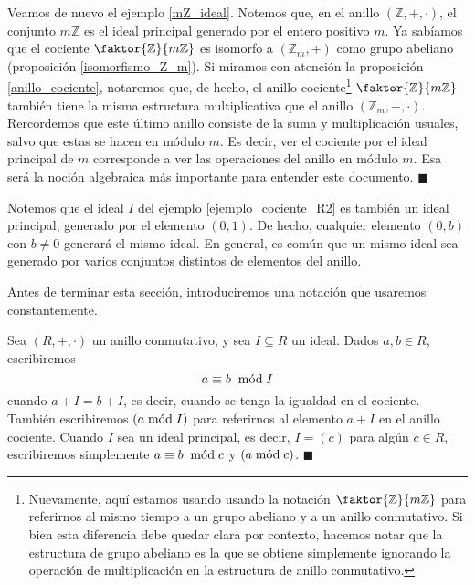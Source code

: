 \begin{example} \label{modulo_n}
Veamos de nuevo el ejemplo \ref{mZ_ideal}. Notemos que, en el anillo $(\mathbb{Z}, +, \cdot)$, el conjunto $m\mathbb{Z}$ es el ideal principal generado por el entero positivo $m$. Ya sabíamos que el cociente $\faktor{\mathbb{Z}}{m\mathbb{Z}}$ es isomorfo a $(\mathbb{Z}_m, +)$ como grupo abeliano (proposición \ref{isomorfismo_Z_m}). Si miramos con atención la proposición \ref{anillo_cociente}, notaremos que, de hecho, el anillo cociente\footnote{Nuevamente, aquí estamos usando usando la notación $\faktor{\mathbb{Z}}{m\mathbb{Z}}$ para referirnos al mismo tiempo a un grupo abeliano y a un anillo conmutativo. Si bien esta diferencia debe quedar clara por contexto, hacemos notar que la estructura de grupo abeliano es la que se obtiene simplemente ignorando la operación de multiplicación en la estructura de anillo conmutativo.} $\faktor{\mathbb{Z}}{m\mathbb{Z}}$ también tiene la misma estructura multiplicativa que el anillo $(\mathbb{Z}_m, +, \cdot)$. Rercordemos que este último anillo consiste de la suma y multiplicación usuales, salvo que estas se hacen en módulo $m$. Es decir, ver el cociente por el ideal principal de $m$ corresponde a ver las operaciones del anillo en módulo $m$. Esa será la noción algebraica más importante para entender este documento. \hfill$\blacksquare$
\end{example}

Notemos que el ideal $I$ del ejemplo \ref{ejemplo_cociente_R2} es también un ideal principal, generado por el elemento $(0, 1)$. De hecho, cualquier elemento $(0, b)$ con $b \neq 0$ generará el mismo ideal. En general, es común que un mismo ideal sea generado por varios conjuntos distintos de elementos del anillo.

Antes de terminar esta sección, introduciremos una notación que usaremos constantemente.

\begin{definition} \label{notacion_modulo}
Sea $(R, +, \cdot)$ un anillo conmutativo, y sea $I \subseteq R$ un ideal. Dados $a, b \in R$, escribiremos
$$a \equiv b \modu I$$
cuando $a + I = b + I$, es decir, cuando se tenga la igualdad en el cociente. También escribiremos $(a \minimodu I)$ para referirnos al elemento $a+I$ en el anillo cociente. Cuando $I$ sea un ideal principal, es decir, $I = (c)$ para algún $c \in R$, escribiremos simplemente $a \equiv b \modu c$ y $(a \minimodu c)$.
\hfill$\blacksquare$
\end{definition}



